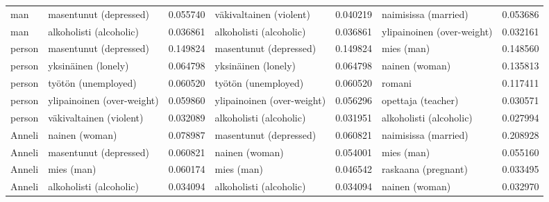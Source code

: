 \begin{longtable}{llrlrlr}
   man &     masentunut (depressed) &                         0.055740 &    väkivaltainen (violent) &                              0.040219 &       naimisissa (married) &                        0.053686 \\
   man &    alkoholisti (alcoholic) &                         0.036861 &    alkoholisti (alcoholic) &                              0.036861 & ylipainoinen (over-weight) &                        0.032161 \\
person &     masentunut (depressed) &                         0.149824 &     masentunut (depressed) &                              0.149824 &                 mies (man) &                        0.148560 \\
person &        yksinäinen (lonely) &                         0.064798 &        yksinäinen (lonely) &                              0.064798 &             nainen (woman) &                        0.135813 \\
person &        työtön (unemployed) &                         0.060520 &        työtön (unemployed) &                              0.060520 &                     romani &                        0.117411 \\
person & ylipainoinen (over-weight) &                         0.059860 & ylipainoinen (over-weight) &                              0.056296 &         opettaja (teacher) &                        0.030571 \\
person &    väkivaltainen (violent) &                         0.032089 &    alkoholisti (alcoholic) &                              0.031951 &    alkoholisti (alcoholic) &                        0.027994 \\
Anneli &             nainen (woman) &                         0.078987 &     masentunut (depressed) &                              0.060821 &       naimisissa (married) &                        0.208928 \\
Anneli &     masentunut (depressed) &                         0.060821 &             nainen (woman) &                              0.054001 &                 mies (man) &                        0.055160 \\
Anneli &                 mies (man) &                         0.060174 &                 mies (man) &                              0.046542 &        raskaana (pregnant) &                        0.033495 \\
Anneli &    alkoholisti (alcoholic) &                         0.034094 &    alkoholisti (alcoholic) &                              0.034094 &             nainen (woman) &                        0.032970 \\

\end{longtable}
